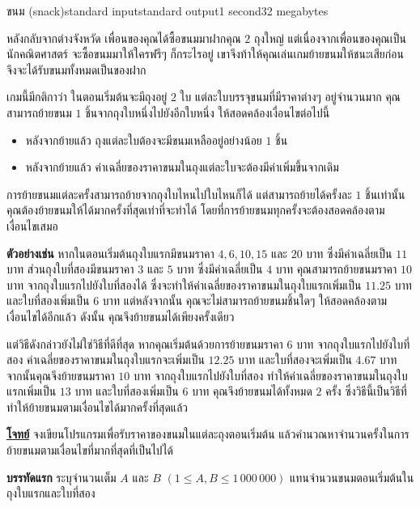 \documentclass[11pt,a4paper]{article}
\begin{document}
\begin{problem}{ขนม (snack)}{standard input}{standard output}{1 second}{32 megabytes}

หลังกลับจากต่างจังหวัด เพื่อนของคุณได้ซื้อขนมมาฝากคุณ $2$ ถุงใหญ่ แต่เนื่องจากเพื่อนของคุณเป็นนักคณิตศาสตร์ จะซื้อขนมมาให้ใครฟรีๆ ก็กระไรอยู่ เขาจึงท้าให้คุณเล่นเกมย้ายขนมให้ชนะเสียก่อน จึงจะได้รับขนมทั้งหมดเป็นของฝาก

เกมนี้มีกติกาว่า ในตอนเริ่มต้นจะมีถุงอยู่ $2$ ใบ แต่ละใบบรรจุขนมที่มีราคาต่างๆ อยู่จำนวนมาก คุณสามารถย้ายขนม $1$ ชิ้นจากถุงใบหนึ่งไปยังอีกใบหนึ่ง ให้สอดคล้องเงื่อนไขต่อไปนี้

\begin{itemize}

\item หลังจากย้ายแล้ว ถุงแต่ละใบต้องจะมีขนมเหลืออยู่อย่างน้อย $1$ ชิ้น
\item หลังจากย้ายแล้ว ค่าเฉลี่ยของราคาขนมในถุงแต่ละใบจะต้องมีค่าเพิ่มขึ้นจากเดิม
\end{itemize}

การย้ายขนมแต่ละครั้งสามารถย้ายจากถุงใบไหนไปใบไหนก็ได้ แต่สามารถย้ายได้ครั้งละ $1$ ชิ้นเท่านั้น คุณต้องย้ายขนมให้ได้มากครั้งที่สุดเท่าที่จะทำได้ โดยที่การย้ายขนมทุกครั้งจะต้องสอดคล้องตามเงื่อนไขเสมอ

\textbf{ตัวอย่างเช่น} หากในตอนเริ่มต้นถุงใบแรกมีขนมราคา $4, 6, 10, 15$ และ $20$ บาท ซึ่งมีค่าเฉลี่ยเป็น $11$ บาท ส่วนถุงใบที่สองมีขนมราคา $3$ และ $5$ บาท ซึ่งมีค่าเฉลี่ยเป็น $4$ บาท คุณสามารถย้ายขนมราคา $10$ บาท จากถุงใบแรกไปยังใบที่สองได้ ซึ่งจะทำให้ค่าเฉลี่ยของราคาขนมในถุงใบแรกเพิ่มเป็น $11.25$ บาท และใบที่สองเพิ่มเป็น $6$ บาท แต่หลังจากนั้น คุณจะไม่สามารถย้ายขนมชิ้นใดๆ ให้สอดคล้องตามเงื่อนไขได้อีกแล้ว ดังนั้น คุณจึงย้ายขนมได้เพียงครั้งเดียว

แต่วิธีดังกล่าวยังไม่ใช่วิธีที่ดีที่สุด หากคุณเริ่มต้นด้วยการย้ายขนมราคา $6$ บาท จากถุงใบแรกไปยังใบที่สอง ค่าเฉลี่ยของราคาขนมในถุงใบแรกจะเพิ่มเป็น $12.25$ บาท และใบที่สองจะเพิ่มเป็น $4.67$ บาท จากนั้นคุณจึงย้ายขนมราคา $10$ บาท จากถุงใบแรกไปยังใบที่สอง ทำให้ค่าเฉลี่ยของราคาขนมในถุงใบแรกเพิ่มเป็น $13$ บาท และใบที่สองเพิ่มเป็น $6$ บาท คุณจึงย้ายขนมได้ทั้งหมด $2$ ครั้ง ซึ่งวิธีนี้เป็นวิธีที่ทำให้ย้ายขนมตามเงื่อนไขได้มากครั้งที่สุดแล้ว

\bigskip
\underline{\textbf{โจทย์}}  จงเขียนโปรแกรมเพื่อรับราคาของขนมในแต่ละถุงตอนเริ่มต้น แล้วคำนวณหาจำนวนครั้งในการย้ายขนมตามเงื่อนไขที่มากที่สุดที่เป็นไปได้


\InputFile

\textbf{บรรทัดแรก} ระบุจำนวนเต็ม $A$ และ $B$ $(1 \leq  A,B \leq 1\,000\,000)$ แทนจำนวนขนมตอนเริ่มต้นในถุงใบแรกและใบที่สอง


\end{problem}
\end{document}
